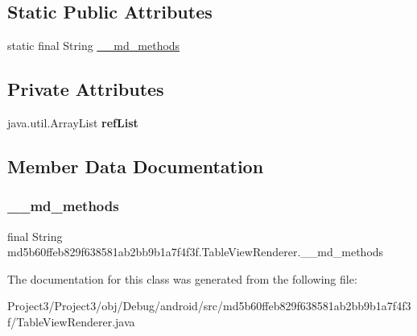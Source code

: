 \subsection*{Static Public Attributes}
\begin{DoxyCompactItemize}
\item 
static final String \hyperlink{classmd5b60ffeb829f638581ab2bb9b1a7f4f3f_1_1TableViewRenderer_abfca855cef125ff9e66a6690bfef09b8}{\+\_\+\+\_\+md\+\_\+methods}
\end{DoxyCompactItemize}
\subsection*{Private Attributes}
\begin{DoxyCompactItemize}
\item 
\mbox{\label{classmd5b60ffeb829f638581ab2bb9b1a7f4f3f_1_1TableViewRenderer_a98f8a583ce568ff85385a44cc922c5d1}} 
java.\+util.\+Array\+List {\bfseries ref\+List}
\end{DoxyCompactItemize}


\subsection{Member Data Documentation}
\mbox{\label{classmd5b60ffeb829f638581ab2bb9b1a7f4f3f_1_1TableViewRenderer_abfca855cef125ff9e66a6690bfef09b8}} 
\subsubsection{\texorpdfstring{\+\_\+\+\_\+md\+\_\+methods}{\_\_md\_methods}}
{\footnotesize\ttfamily final String md5b60ffeb829f638581ab2bb9b1a7f4f3f.\+Table\+View\+Renderer.\+\_\+\+\_\+md\+\_\+methods\hspace{0.3cm}{\ttfamily [static]}}



The documentation for this class was generated from the following file\+:\begin{DoxyCompactItemize}
\item 
Project3/\+Project3/obj/\+Debug/android/src/md5b60ffeb829f638581ab2bb9b1a7f4f3f/Table\+View\+Renderer.\+java\end{DoxyCompactItemize}
